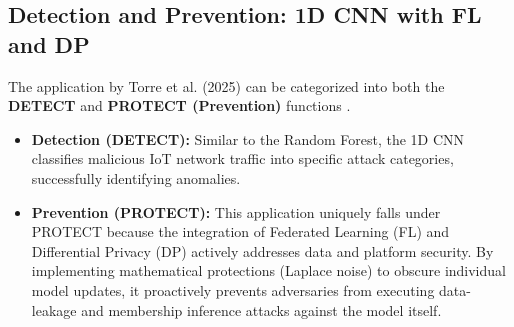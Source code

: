 \documentclass[letterpaper]{article}
\begin{document}
\subsection*{Detection and Prevention: 1D CNN with FL and DP}
The application by Torre et al. (2025) can be categorized into both the \textbf{DETECT} and \textbf{PROTECT (Prevention)} functions \cite{nist_csf_2_0}.
\begin{itemize}
    \item \textbf{Detection (DETECT):} Similar to the Random Forest, the 1D CNN classifies malicious IoT network traffic into specific attack categories, successfully identifying anomalies.
    \item \textbf{Prevention (PROTECT):} This application uniquely falls under PROTECT because the integration of Federated Learning (FL) and Differential Privacy (DP) actively addresses data and platform security. By implementing mathematical protections (Laplace noise) to obscure individual model updates, it proactively prevents adversaries from executing data-leakage and membership inference attacks against the model itself.
\end{itemize}

\newpage
\section{}

\printbibliography[title={References}]
\end{document}
